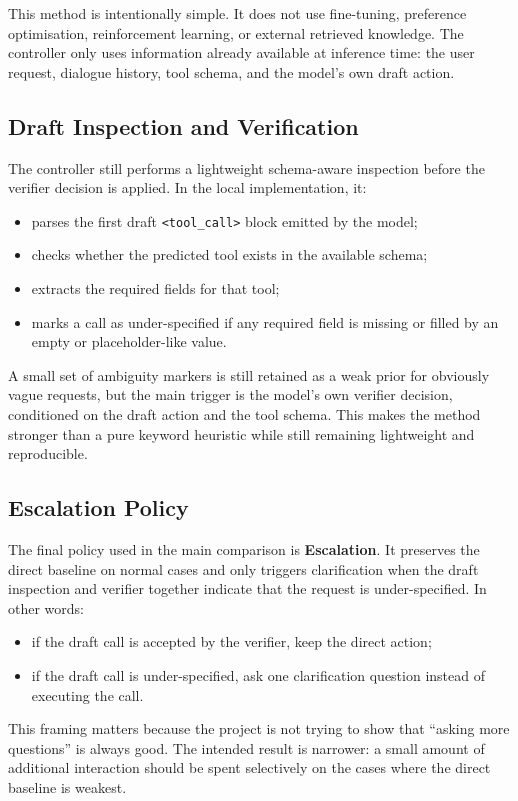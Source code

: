 \documentclass[10pt,twocolumn]{article}
\begin{document}
This method is intentionally simple. It does not use fine-tuning, preference optimisation, reinforcement learning, or external retrieved knowledge. The controller only uses information already available at inference time: the user request, dialogue history, tool schema, and the model's own draft action.

\subsection{Draft Inspection and Verification}
The controller still performs a lightweight schema-aware inspection before the verifier decision is applied. In the local implementation, it:
\begin{itemize}
    \item parses the first draft \texttt{<tool\_call>} block emitted by the model;
    \item checks whether the predicted tool exists in the available schema;
    \item extracts the required fields for that tool;
    \item marks a call as under-specified if any required field is missing or filled by an empty or placeholder-like value.
\end{itemize}

A small set of ambiguity markers is still retained as a weak prior for obviously vague requests, but the main trigger is the model's own verifier decision, conditioned on the draft action and the tool schema. This makes the method stronger than a pure keyword heuristic while still remaining lightweight and reproducible.

\subsection{Escalation Policy}
The final policy used in the main comparison is \textbf{Escalation}. It preserves the direct baseline on normal cases and only triggers clarification when the draft inspection and verifier together indicate that the request is under-specified. In other words:
\begin{itemize}
    \item if the draft call is accepted by the verifier, keep the direct action;
    \item if the draft call is under-specified, ask one clarification question instead of executing the call.
\end{itemize}

This framing matters because the project is not trying to show that ``asking more questions'' is always good. The intended result is narrower: a small amount of additional interaction should be spent selectively on the cases where the direct baseline is weakest.
\end{document}
